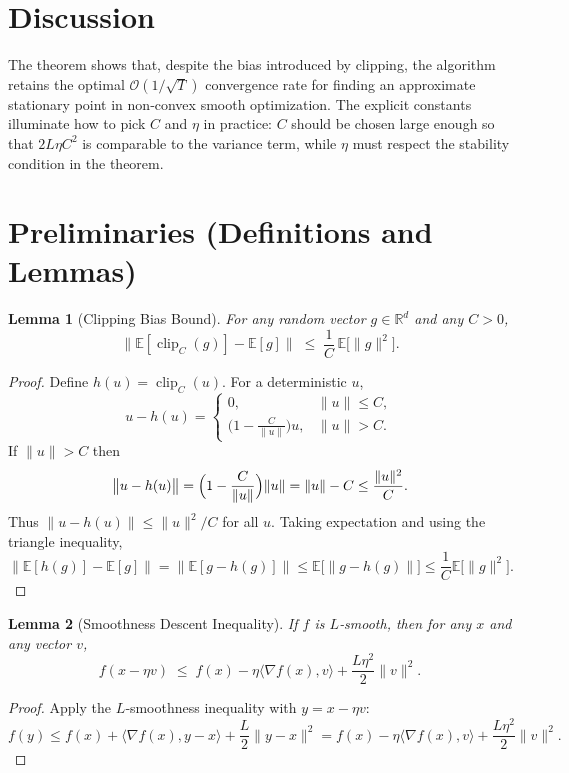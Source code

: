 \documentclass{article}
\newtheorem{lemma}{Lemma}
\newcommand{\E}{\mathbb{E}}
\newcommand{\R}{\mathbb{R}}
\begin{document}
\section*{Discussion}
The theorem shows that, despite the bias introduced by clipping, the algorithm retains the optimal $\mathcal{O}(1/\sqrt{T})$ convergence rate for finding an approximate stationary point in non‑convex smooth optimization. The explicit constants illuminate how to pick $C$ and $\eta$ in practice: $C$ should be chosen large enough so that $2L\eta C^{2}$ is comparable to the variance term, while $\eta$ must respect the stability condition in the theorem.

\section*{Preliminaries (Definitions and Lemmas)}
\begin{lemma}[Clipping Bias Bound]\label{lem:bias}
For any random vector $g\in\R^{d}$ and any $C>0$,
\[
\bigl\| \E[\operatorname{clip}_{C}(g)]-\E[g]\bigr\|
\;\le\;
\frac{1}{C}\,\E\bigl[\|g\|^{2}\bigr].
\]
\end{lemma}
\begin{proof}
Define $h(u)=\operatorname{clip}_{C}(u)$. For a deterministic $u$,
\[
u-h(u)=
\begin{cases}
0, & \|u\|\le C,\\[4pt]
\bigl(1-\frac{C}{\|u\|}\bigr)u, & \|u\|>C .
\end{cases}
\]
If $\|u\|>C$ then
\[
\bigl\|u-h(u)\bigr\|
      =\Bigl(1-\frac{C}{\|u\|}\Bigr)\|u\|
      =\|u\|-C
      \le\frac{\|u\|^{2}}{C}.
\]
Thus $\|u-h(u)\|\le \|u\|^{2}/C$ for all $u$. Taking expectation and using the triangle inequality,
\[
\bigl\|\E[h(g)]-\E[g]\bigr\|
   =\bigl\|\E[g-h(g)]\bigr\|
   \le \E\bigl[\|g-h(g)\|\bigr]
   \le \frac{1}{C}\E\bigl[\|g\|^{2}\bigr].
\]
\qedhere
\end{proof}

\begin{lemma}[Smoothness Descent Inequality]\label{lem:smooth}
If $f$ is $L$‑smooth, then for any $x$ and any vector $v$,
\[
f(x-\eta v)\;\le\; f(x)-\eta\langle\nabla f(x),v\rangle+\frac{L\eta^{2}}{2}\|v\|^{2}.
\]
\end{lemma}
\begin{proof}
Apply the $L$‑smoothness inequality with $y=x-\eta v$:
\[
f(y)\le f(x)+\langle\nabla f(x),y-x\rangle+\frac{L}{2}\|y-x\|^{2}
     = f(x)-\eta\langle\nabla f(x),v\rangle+\frac{L\eta^{2}}{2}\|v\|^{2}.
\]
\qedhere
\end{proof}
\end{document}
